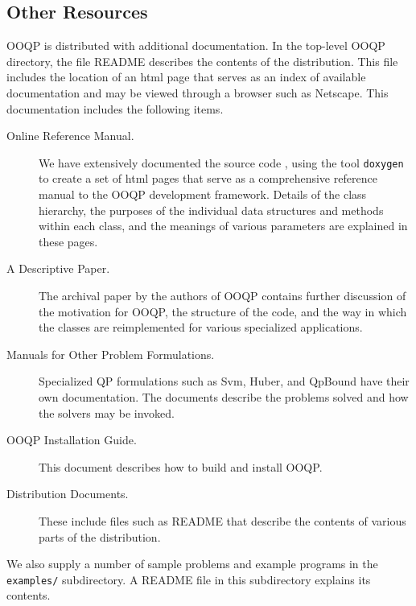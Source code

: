 \subsection{Other Resources}
\label{sec.other-resources}

OOQP is distributed with additional documentation. In the top-level
OOQP directory, the file README describes the contents of the
distribution. This file includes the location of an html page that
serves as an index of available documentation and may be viewed
through a browser such as Netscape. This documentation includes the
following items.
\begin{description}
  
\item[Online Reference Manual.]  We have extensively documented the
  source code , using the tool {\tt doxygen} to create a set of html
  pages that serve as a comprehensive reference manual to the OOQP
  development framework. Details of the class hierarchy, the purposes
  of the individual data structures and methods within each class, and
  the meanings of various parameters are explained in these pages.
  
\item[A Descriptive Paper.] The archival paper \cite{GerW01} by the
authors of OOQP contains further discussion of the motivation for
OOQP, the structure of the code, and the way in which the classes are
reimplemented for various specialized applications.
  
\item[Manuals for Other Problem Formulations.] Specialized QP
  formulations such as Svm, Huber, and QpBound have their own
  documentation. The documents describe the problems solved and how
  the solvers may be invoked.

\item[OOQP Installation Guide.] This document describes how to build
and install OOQP.

\item[Distribution Documents.] These include files such as README
that describe the contents of various parts of the distribution.

\end{description}

We also supply a number of sample problems and example programs in the
\texttt{examples/} subdirectory. A README file in this subdirectory
explains its contents.


